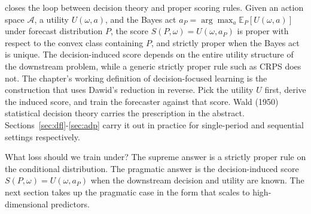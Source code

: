 \citet{Dawid1998} closes the loop between decision theory and proper scoring
rules. Given an action space $\mathcal A$, a utility $U(\omega, a)$, and the
Bayes act $a_P = \arg\max_a \mathbb E_P[U(\omega, a)]$ under forecast
distribution $P$, the score $S(P, \omega) = U(\omega, a_P)$ is proper with
respect to the convex class containing $P$, and strictly proper when the
Bayes act is unique. The decision-induced score depends on the entire utility
structure of the downstream problem, while a generic strictly proper rule
such as CRPS does not. The chapter's working definition of decision-focused
learning is the construction that uses Dawid's reduction in reverse. Pick the
utility $U$ first, derive the induced score, and train the forecaster against
that score. Wald (1950) statistical decision theory carries the prescription
in the abstract. Sections~\ref{sec:dfl}-\ref{sec:adp} carry it out in
practice for single-period and sequential settings respectively.

What loss should we train under? The supreme answer is a strictly proper
rule on the conditional distribution. The pragmatic answer is the
decision-induced score $S(P, \omega) = U(\omega, a_P)$ when the downstream
decision and utility are known. The next section takes up the pragmatic
case in the form that scales to high-dimensional predictors.
